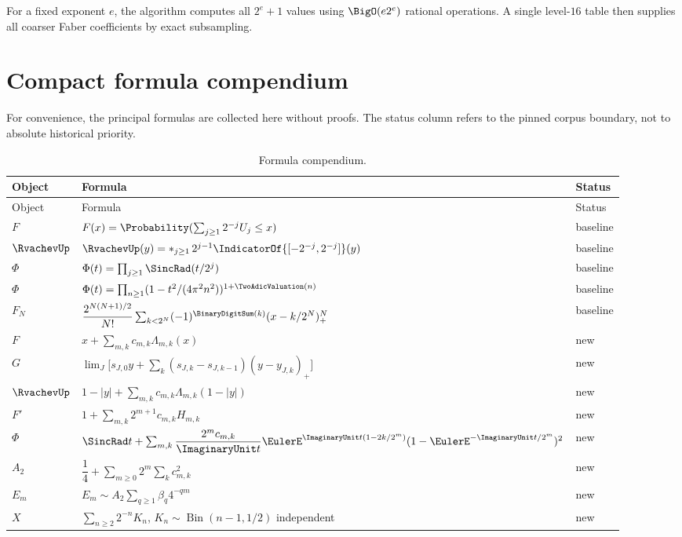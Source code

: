 \documentclass[11pt]{article}
\theoremstyle{definition}
\theoremstyle{remark}
\begin{document}
For a fixed exponent $e$, the algorithm computes all $2^e+1$ values using
$\BigO(e2^e)$ rational operations.  A single level-$16$ table then supplies
all coarser Faber coefficients by exact subsampling.

\section{Compact formula compendium}
\label{p8:app:compendium}

For convenience, the principal formulas are collected here without proofs.
The status column refers to the pinned corpus boundary, not to absolute
historical priority.

\begin{longtable}{@{}p{}p{}p{}@{}}
\caption{Formula compendium.}\label{p8:tab:compendium}\\
\toprule
Object & Formula & Status\\
\midrule
\endfirsthead
\toprule
Object & Formula & Status\\
\midrule
\endhead
$F$ & $F(x)=\Probability(\sum_{j\ge1}2^{-j}U_j\le x)$ & baseline\\
$\RvachevUp$ & $\RvachevUp(y)=\mathop{\ast}_{j\ge1}2^{j-1}\IndicatorOf{[-2^{-j},2^{-j}]}(y)$ & baseline\\
$\Phi$ & $\Phi(t)=\prod_{j\ge1}\SincRad(t/2^j)$ & baseline\\
$\Phi$ & $\Phi(t)=\prod_{n\ge1}(1-t^2/(4\pi^2n^2))^{1+\TwoAdicValuation(n)}$ & baseline\\
$F_N$ & $\dfrac{2^{N(N+1)/2}}{N!}\sum_{k<2^N}(-1)^{\BinaryDigitSum(k)}(x-k/2^N)_+^N$ & baseline\\
$F$ & $x+\sum_{m,k}c_{m,k}\Lambda_{m,k}(x)$ & new\\
$G$ & $\lim_J\bigl[s_{J,0}y+\sum_k(s_{J,k}-s_{J,k-1})(y-y_{J,k})_+\bigr]$ & new\\
$\RvachevUp$ & $1-|y|+\sum_{m,k}c_{m,k}\Lambda_{m,k}(1-|y|)$ & new\\
$F'$ & $1+\sum_{m,k}2^{m+1}c_{m,k}H_{m,k}$ & new\\
$\Phi$ & $\SincRad t+\sum_{m,k}\dfrac{2^mc_{m,k}}{\ImaginaryUnit t}\EulerE^{\ImaginaryUnit t(1-2k/2^m)}(1-\EulerE^{-\ImaginaryUnit t/2^m})^2$ & new\\
$A_2$ & $\dfrac14+\sum_{m\ge0}2^m\sum_kc_{m,k}^2$ & new\\
$E_m$ & $E_m\sim A_2\sum_{q\ge1}\beta_q4^{-qm}$ & new\\
$X$ & $\sum_{n\ge2}2^{-n}K_n$, $K_n\sim\operatorname{Bin}(n-1,1/2)$ independent & new\\

\end{longtable}
\end{document}
